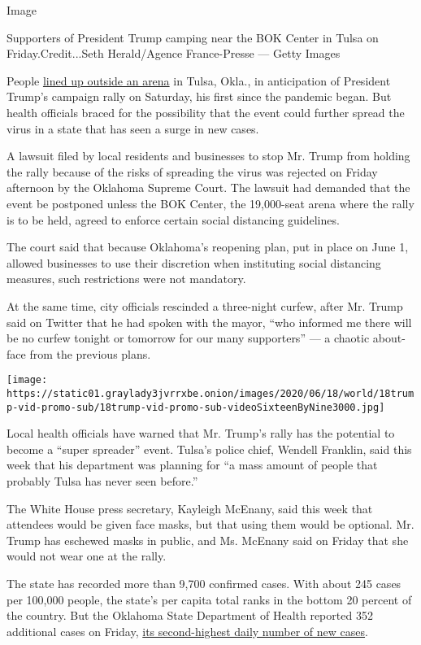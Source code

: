 Image

Supporters of President Trump camping near the BOK Center in Tulsa on
Friday.Credit...Seth Herald/Agence France-Presse --- Getty Images

People
\href{https://www.nytimes3xbfgragh.onion/video/us/politics/100000007199618/trump-tulsa-rally-supporters-coronavirus.html}{lined
up outside an arena} in Tulsa, Okla., in anticipation of President
Trump's campaign rally on Saturday, his first since the pandemic began.
But health officials braced for the possibility that the event could
further spread the virus in a state that has seen a surge in new cases.

A lawsuit filed by local residents and businesses to stop Mr. Trump from
holding the rally because of the risks of spreading the virus was
rejected on Friday afternoon by the Oklahoma Supreme Court. The lawsuit
had demanded that the event be postponed unless the BOK Center, the
19,000-seat arena where the rally is to be held, agreed to enforce
certain social distancing guidelines.

The court said that because Oklahoma's reopening plan, put in place on
June 1, allowed businesses to use their discretion when instituting
social distancing measures, such restrictions were not mandatory.

At the same time, city officials rescinded a three-night curfew, after
Mr. Trump said on Twitter that he had spoken with the mayor, ``who
informed me there will be no curfew tonight or tomorrow for our many
supporters'' --- a chaotic about-face from the previous plans.

\texttt{[image: https://static01.graylady3jvrrxbe.onion/images/2020/06/18/world/18trump-vid-promo-sub/18trump-vid-promo-sub-videoSixteenByNine3000.jpg]}

Local health officials have warned that Mr. Trump's rally has the
potential to become a ``super spreader'' event. Tulsa's police chief,
Wendell Franklin, said this week that his department was planning for
``a mass amount of people that probably Tulsa has never seen before.''

The White House press secretary, Kayleigh McEnany, said this week that
attendees would be given face masks, but that using them would be
optional. Mr. Trump has eschewed masks in public, and Ms. McEnany said
on Friday that she would not wear one at the rally.

The state has recorded more than 9,700 confirmed cases. With about 245
cases per 100,000 people, the state's per capita total ranks in the
bottom 20 percent of the country. But the Oklahoma State Department of
Health reported 352 additional cases on Friday,
\href{https://www.nytimes3xbfgragh.onion/interactive/2020/us/oklahoma-coronavirus-cases.html}{its
second-highest daily number of new cases}.

